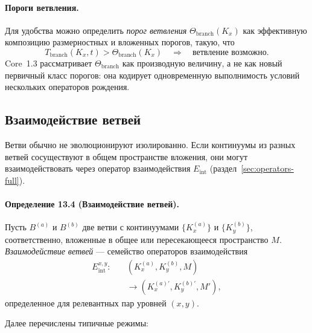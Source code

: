 \paragraph{Пороги ветвления.}
Для удобства можно определить \emph{порог ветвления}
\(\Theta_{\mathrm{branch}}(K_x)\) как эффективную композицию
размерностных и вложенных порогов, такую, что
\[
  T_{\mathrm{branch}}(K_x,t) > \Theta_{\mathrm{branch}}(K_x)
  \quad\Rightarrow\quad
  \text{ветвление возможно.}
\]
Core~1.3 рассматривает \(\Theta_{\mathrm{branch}}\) как производную величину,
а не как новый первичный класс порогов: она кодирует одновременную
выполнимость условий нескольких операторов рождения.

\subsection{Взаимодействие ветвей}

Ветви обычно не эволюционируют изолированно. Если континуумы из разных
ветвей сосуществуют в общем пространстве вложения, они могут взаимодействовать
через оператор взаимодействия \(E_{\mathrm{int}}\)
(раздел~\ref{sec:operators-full}).

\paragraph{Определение 13.4 (Взаимодействие ветвей).}
Пусть \(B^{(a)}\) и \(B^{(b)}\) две ветви с континуумами
\(\{K_x^{(a)}\}\) и \(\{K_y^{(b)}\}\), соответственно, вложенные в
общее или пересекающееся пространство \(M\). \emph{Взаимодействие ветвей} —
семейство операторов взаимодействия
\[
\begin{aligned}
  E_{\mathrm{int}}^{x,y}:\quad
    &(K_x^{(a)}, K_y^{(b)}, M)\\
    &\longrightarrow (K_x^{(a)\prime}, K_y^{(b)\prime}, M'),
\end{aligned}
\]
определенное для релевантных пар уровней \((x,y)\).

Далее перечислены типичные режимы:

